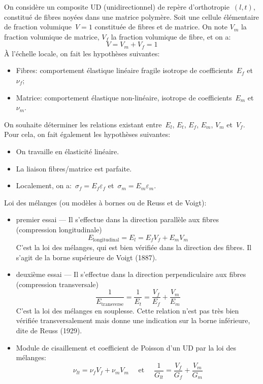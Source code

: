 On considère un composite UD (unidirectionnel) de repère d'orthotropie~$(l,t)$, constitué de fibres noyées dans une matrice polymère. Soit une cellule élémentaire de fraction volumique~$V = 1$ constituée de fibres et de matrice. On note $V_m$ la fraction volumique de matrice, $V_f$ la fraction volumique de fibre, et on a:
\begin{equation} V = V_m + V_f =1 \end{equation}
\medskipvm
À l'échelle locale, on fait les hypothèses suivantes:
\begin{itemize}
  \item Fibres: comportement élastique linéaire fragile isotrope de coefficients~$E_f$ et~$\nu_f$;
  \item Matrice: comportement élastique non-linéaire, isotrope de coefficients~$E_m$ et~$\nu_m$.
\end{itemize}
\medskipvm
On souhaite déterminer les relations existant entre~$E_l$, $E_t$, $E_f$, $E_m$, $V_m$ et~$V_f$.
\medskipvm
Pour cela, on fait également les hypothèses suivantes:
\begin{itemize}
  \item On travaille en élasticité linéaire.
  \item La liaison fibres/matrice est parfaite.
  \item Localement, on a:~$\sigma_f = E_f \varepsilon_f$ et~$\sigma_m = E_m \varepsilon_m$.
\end{itemize}
\medskipvm
Loi des mélanges (ou modèles à bornes ou de Reuss et de Voigt):
\begin{itemize}
	\item premier essai --- Il s'effectue dans la direction parallèle aux fibres (compression longitudinale)
		\begin{equation} E_{\text{longitudinal}}=E_l=E_fV_f+E_mV_m \end{equation}
		C'est la loi des mélanges, qui est bien vérifiée dans la direction des fibres.
		Il s'agit de la borne supérieure de Voigt (1887).
	\item deuxième essai --- Il s'effectue dans la direction perpendiculaire aux fibres (compression transversale)
		\begin{equation}\dfrac1{E_{\text{transverse}}}=\dfrac1{E_t} = \dfrac{V_f}{E_f}+\dfrac{V_m}{E_m}\end{equation}
		C'est la loi des mélanges en souplesse.
		Cette relation n'est pas très bien vérifiée transversalement mais donne une
		indication sur la borne inférieure, dite de Reuss (1929).
	\item Module de cisaillement et coefficient de Poisson
		d'un UD par la loi des mélanges:
		\begin{equation}\nu_{lt}=\nu_fV_f+\nu_mV_m\quad\text{ et }\quad\dfrac1{G_{lt}} = \dfrac{V_f}{G_f}+\dfrac{V_m}{G_m}\end{equation}
\end{itemize}
